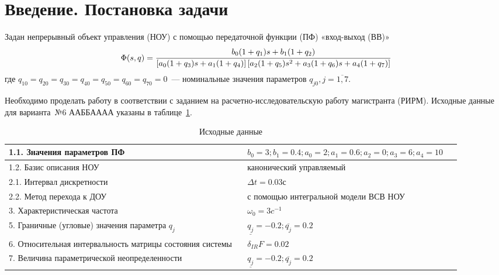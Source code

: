 \section*{Введение. Постановка задачи}

Задан непрерывный объект управления (НОУ) с помощью передаточной функции (ПФ) «вход-выход (ВВ)»
\begin{equation}\label{eq_pf0}
	\Phi (s, q) = \cfrac{b_0 (1 + q_1) s + b_1 (1 + q_2)}{\left[a_0 (1+q_3)s + a_1 (1+q_4)\right]\left[a_2 (1+q_5) s^2 + a_3 (1 + q_6) s + a_4 (1 + q_7)\right]}
\end{equation}
где $q_{10}=q_{20}=q_{30}=q_{40}=q_{50}=q_{60}=q_{70}=0$~--- номинальные значения параметров $q_{j0}, j = \overline{1,7}$.

Необходимо проделать работу в соответствии с заданием на расчетно-исследовательскую  работу магистранта (РИРМ). Исходные данные для варианта~№6 ААББАААА указаны в таблице~\ref{problem_data}.

\begin{table}[h!]
	\caption{Исходные данные}
	\begin{tabular}{|p{0.5\linewidth}|p{0.4\linewidth}|}
\hline
1.1. Значения параметров ПФ & 
$b_0 = 3; b_1 = 0.4; a_0=2; a_1 = 0.6; a_2 = 0; a_3 = 6; a_4 = 10$
\\
\hline
1.2. Базис описания НОУ & канонический управляемый
\\
\hline
2.1. Интервал дискретности & $\Delta{t} = 0.03$с\\
\hline
2.2. Метод перехода к ДОУ & с помощью интегральной модели ВСВ НОУ
\\
\hline
3. Характеристическая частота  & $\omega_0 = 3 c^{-1}$\\
\hline
5. Граничные (угловые) значения параметра $q_j$  & $\underline{q_j} = -0.2; \overline{q_j} = 0.2$ \\ 
\hline
6. Относительная интервальность матрицы состояния системы & $\delta_{IR} F = 0.02$\\
\hline
7. Величина параметрической неопределенности  & $\underline{q_j} = -0.2; \overline{q_j} = 0.2$\\
\hline
	\end{tabular}
	\label{problem_data}
\end{table}


\newpage